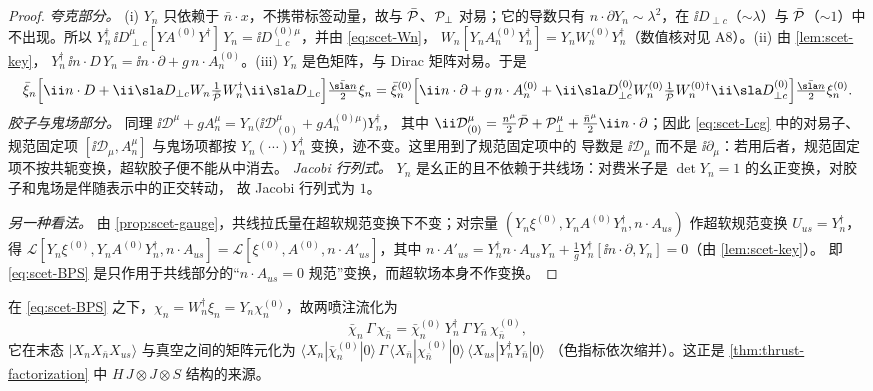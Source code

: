 \begin{proof}
\emph{夸克部分。} (i) $Y_n$ 只依赖于 $\bar n\cdot x$，不携带标签动量，故与 $\bar{\mathcal P}$、$\mathcal P_{\perp}$ 对易；它的导数只有
$n\cdot\partial Y_n\sim\lambda^2$，在 $\ii D_{\perp c}$（$\sim\lambda$）与 $\bar{\mathcal P}$（$\sim1$）中不出现。所以
$Y_n^\dagger\,\ii D^\mu_{\perp c}[YA^{(0)}Y^\dagger]\,Y_n=\ii D^{(0)\mu}_{\perp c}$，并由 \cref{eq:scet-Wn}，
$W_n[Y_nA^{(0)}_nY_n^\dagger]=Y_nW_n^{(0)}Y_n^\dagger$（数值核对见 A8）。(ii) 由 \cref{lem:scet-key}，
$Y_n^\dagger\,\ii n\cdot D\,Y_n=\ii n\cdot\partial+g\,n\cdot A_n^{(0)}$。(iii) $Y_n$ 是色矩阵，与 Dirac 矩阵对易。于是
\[
\bar\xi_n\Big[\ii n\cdot D+\ii\sla D_{\perp c}W_n\tfrac1{\Pbar}W_n^\dagger\ii\sla D_{\perp c}\Big]\tfrac{\nbslash}{2}\xi_n
=\bar\xi^{(0)}_n\Big[\ii n\cdot\partial+g\,n\cdot A^{(0)}_n+\ii\sla D^{(0)}_{\perp c}W^{(0)}_n\tfrac1{\Pbar}W^{(0)\dagger}_n\ii\sla D^{(0)}_{\perp c}\Big]\tfrac{\nbslash}{2}\xi^{(0)}_n .
\]
\emph{胶子与鬼场部分。} 同理 $\ii\mathcal D^\mu+gA_n^\mu=Y_n\big(\ii\mathcal D^\mu_{(0)}+gA_n^{(0)\mu}\big)Y_n^\dagger$，
其中 $\ii\mathcal D^\mu_{(0)}=\frac{n^\mu}{2}\Pbar+\Pperp^\mu+\frac{\bar n^\mu}{2}\ii n\cdot\partial$；因此 \cref{eq:scet-Lcg} 中的对易子、
规范固定项 $[\ii\mathcal D_\mu,A_n^\mu]$ 与鬼场项都按 $Y_n(\cdots)Y_n^\dagger$ 变换，迹不变。这里用到了规范固定项中的
导数是 $\ii\mathcal D_\mu$ 而不是 $\ii\partial_\mu$：若用后者，规范固定项不按共轭变换，超软胶子便不能从中消去。
\emph{Jacobi 行列式。} $Y_n$ 是幺正的且不依赖于共线场：对费米子是 $\det Y_n=1$ 的幺正变换，对胶子和鬼场是伴随表示中的正交转动，
故 Jacobi 行列式为 $1$。

\emph{另一种看法。} 由 \cref{prop:scet-gauge}，共线拉氏量在超软规范变换下不变；对宗量 $(Y_n\xi^{(0)},Y_nA^{(0)}Y_n^\dagger,n\cdot A_{us})$ 作超软规范变换 $U_{us}=Y_n^\dagger$，得
$\mathcal L[Y_n\xi^{(0)},Y_nA^{(0)}Y_n^\dagger,n\cdot A_{us}]=\mathcal L[\xi^{(0)},A^{(0)},n\cdot A'_{us}]$，其中
$n\cdot A'_{us}=Y_n^\dagger n\cdot A_{us}Y_n+\frac1gY_n^\dagger[\ii n\cdot\partial,Y_n]=0$（由 \cref{lem:scet-key}）。
即 \cref{eq:scet-BPS} 是只作用于共线部分的“$n\cdot A_{us}=0$ 规范”变换，而超软场本身不作变换。
\end{proof}

\begin{corollary}\label{cor:scet-current-Y}
在 \cref{eq:scet-BPS} 之下，$\chi_n=W_n^\dagger\xi_n=Y_n\chi_n^{(0)}$，故两喷注流化为
\begin{equation}\label{eq:scet-JY}
\bar\chi_n\,\Gamma\,\chi_{\bar n}=\bar\chi^{(0)}_n\,Y_n^\dagger\,\Gamma\,Y_{\bar n}\,\chi^{(0)}_{\bar n},
\end{equation}
它在末态 $|X_nX_{\bar n}X_{us}\rangle$ 与真空之间的矩阵元化为
$\langle X_n|\bar\chi^{(0)}_n|0\rangle\,\Gamma\,\langle X_{\bar n}|\chi^{(0)}_{\bar n}|0\rangle\,\langle X_{us}|Y_n^\dagger Y_{\bar n}|0\rangle$
（色指标依次缩并）。这正是 \cref{thm:thrust-factorization} 中 $H\,J\otimes J\otimes S$ 结构的来源。
\end{corollary}

